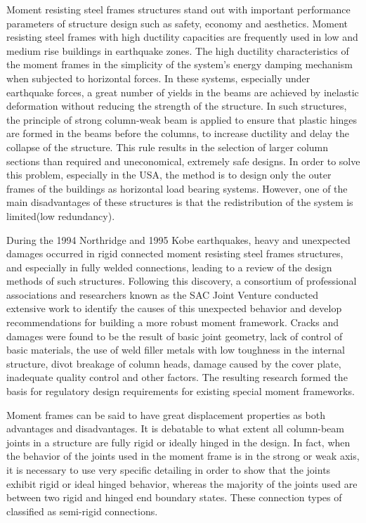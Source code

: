 Moment resisting steel frames structures stand out with important
performance parameters of structure design such as safety, economy
and aesthetics. Moment resisting steel frames with high ductility
capacities are frequently used in low and medium rise buildings in
earthquake zones. The high ductility characteristics of the moment
frames in the simplicity of the system's energy damping mechanism
when subjected to horizontal forces. In these systems, especially
under earthquake forces, a great number of yields in the beams are
achieved by inelastic deformation without reducing the strength of
the structure. In such structures, the principle of strong column-weak
beam is applied to ensure that plastic hinges are formed in the beams
before the columns, to increase ductility and delay the collapse of
the structure. This rule results in the selection of larger column
sections than required and uneconomical, extremely safe designs. In
order to solve this problem, especially in the USA, the method is
to design only the outer frames of the buildings as horizontal load
bearing systems. However, one of the main disadvantages of these structures
is that the redistribution of the system is limited(low redundancy).

During the 1994 Northridge and 1995 Kobe earthquakes, heavy and unexpected
damages occurred in rigid connected moment resisting steel frames
structures, and especially in fully welded connections, leading to
a review of the design methods of such structures. Following this
discovery, a consortium of professional associations and researchers
known as the SAC Joint Venture conducted extensive work to identify
the causes of this unexpected behavior and develop recommendations
for building a more robust moment framework. Cracks and damages were
found to be the result of basic joint geometry, lack of control of
basic materials, the use of weld filler metals with low toughness
in the internal structure, divot breakage of column heads, damage
caused by the cover plate, inadequate quality control and other factors.
The resulting research formed the basis for regulatory design requirements
for existing special moment frameworks.

Moment frames can be said to have great displacement properties as
both advantages and disadvantages. It is debatable to what extent
all column-beam joints in a structure are fully rigid or ideally hinged
in the design. In fact, when the behavior of the joints used in the
moment frame is in the strong or weak axis, it is necessary to use
very specific detailing in order to show that the joints exhibit rigid
or ideal hinged behavior, whereas the majority of the joints used
are between two rigid and hinged end boundary states. These connection
types of classified as semi-rigid connections.

